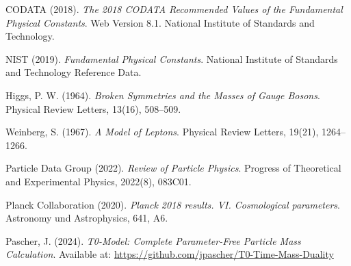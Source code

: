 \documentclass[12pt,a4paper]{article}
\begin{document}
	\newpage
	\begin{thebibliography}{99}
		
		CODATA (2018). \textit{The 2018 CODATA Recommended Values of the Fundamental Physical Constants}. 
		Web Version 8.1. National Institute of Standards and Technology.
		
		NIST (2019). \textit{Fundamental Physical Constants}. 
		National Institute of Standards and Technology Reference Data.
		
		Higgs, P. W. (1964). \textit{Broken Symmetries and the Masses of Gauge Bosons}. 
		Physical Review Letters, 13(16), 508–509.
		
		Weinberg, S. (1967). \textit{A Model of Leptons}. 
		Physical Review Letters, 19(21), 1264–1266.
		
		Particle Data Group (2022). \textit{Review of Particle Physics}. 
		Progress of Theoretical and Experimental Physics, 2022(8), 083C01.
		
		Planck Collaboration (2020). \textit{Planck 2018 results. VI. Cosmological parameters}. 
		Astronomy und Astrophysics, 641, A6.
		
		Pascher, J. (2024). \textit{T0-Model: Complete Parameter-Free Particle Mass Calculation}. 
		Available at: \url{https://github.com/jpascher/T0-Time-Mass-Duality}
		
	\end{thebibliography}
	
\end{document}
